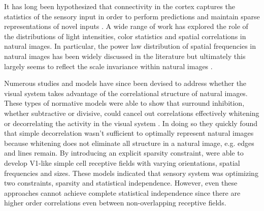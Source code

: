 It has long been hypothesized that connectivity in the cortex captures
the statistics of the sensory input in order to perform predictions
and maintain sparse representations of novel inputs
\citep{Simoncelli2001}. A wide range of work has explored the role of
the distributions of light intensities, color statistics and spatial
correlations in natural images. In particular, the power law
distribution of spatial frequencies in natural images has been widely
discussed in the literature but ultimately this largely seems to
reflect the scale invariance within natural images
\citep{Ruderman1997}.

Numerous studies and models have since been devised to address whether
the visual system takes advantage of the correlational structure of
natural images. These types of normative models were able to show that
surround inhibition, whether subtractive or divisive, could cancel out
correlations effectively whitening or decorrelating the activity in
the visual system \citep{Srinivasan1982, Atick1992}. In doing so they
quickly found that simple decorrelation wasn't sufficient to optimally
represent natural images because whitening does not eliminate all
structure in a natural image, e.g. edges and lines remain. By
introducing an explicit sparsity constraint, \cite{Olshausen1996} were
able to develop V1-like simple cell receptive fields with varying
orientations, spatial frequencies and sizes. These models indicated
that sensory system was optimizing two constraints, sparsity and
statistical independence. However, even these approaches cannot
achieve complete statistical independence since there are higher order
correlations even between non-overlapping receptive fields.

